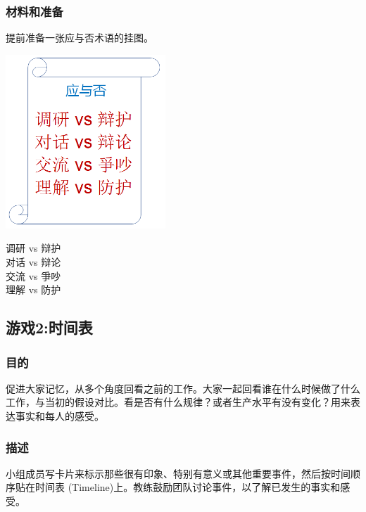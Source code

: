 \hypertarget{ux6750ux6599ux548cux51c6ux5907}{%
\subsubsection{材料和准备}\label{ux6750ux6599ux548cux51c6ux5907}}

提前准备一张应与否术语的挂图。



\includegraphics[width=6cm]{Derby_42.png}


调研 vs 辩护\\
对话 vs 辩论\\
交流 vs 爭吵\\
理解 vs 防护\\

\hypertarget{ux6e38ux620f2ux65f6ux95f4ux8868}{%
\subsection{游戏2:时间表}\label{ux6e38ux620f2ux65f6ux95f4ux8868}}

\hypertarget{ux76eeux7684-1}{%
\subsubsection{目的}\label{ux76eeux7684-1}}

促进大家记忆，从多个角度回看之前的工作。大家一起回看谁在什么时候做了什么工作，与当初的假设对比。看是否有什么规律？或者生产水平有没有变化？用来表达事实和每人的感受。

\hypertarget{ux63cfux8ff0-1}{%
\subsubsection{描述}\label{ux63cfux8ff0-1}}

小组成员写卡片来标示那些很有印象、特别有意义或其他重要事件，然后按时间顺序贴在时间表
(Timeline)上。教练鼓励团队讨论事件，以了解已发生的事实和感受。

